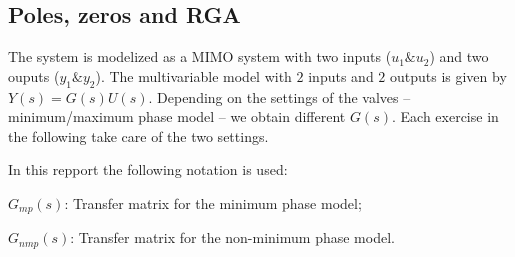 \subsection{Poles, zeros and RGA}

The system is modelized as a MIMO system with two inputs ($u_1 \& u_2$) and two ouputs ($y_1 \& y_2$).
The multivariable model with $2$ inputs and $2$ outputs is given by $Y(s) = G(s)U(s)$.
Depending on the settings of the valves -- minimum/maximum phase model -- we obtain different $G(s)$.
Each exercise in the following take care of the two settings.

In this repport the following notation is used:

\begin{shortitemize}
    \item $G_{mp}(s)$: Transfer matrix for the minimum phase model;
    \item $G_{nmp}(s)$: Transfer matrix for the non-minimum phase model.
\end{shortitemize}
        




% 
% 
